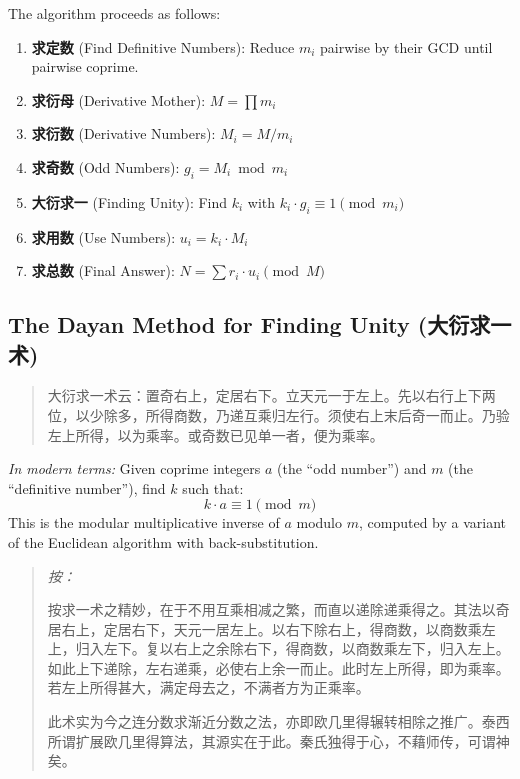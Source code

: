 \documentclass[11pt,a4paper]{article}
\newenvironment{editorial}{%
  \small\begin{quote}\color{prefacecolor}\textit{按：}%
}{\end{quote}\normalsize}
\newcommand{\zhtext}[1]{{\chinese #1}}
\begin{document}
The algorithm proceeds as follows:
\begin{enumerate}[label=Step \arabic*.]
  \item \textbf{求定数} (Find Definitive Numbers): Reduce $m_i$ pairwise by their GCD until pairwise coprime.
  \item \textbf{求衍母} (Derivative Mother): $M = \prod m_i$
  \item \textbf{求衍数} (Derivative Numbers): $M_i = M / m_i$
  \item \textbf{求奇数} (Odd Numbers): $g_i = M_i \bmod m_i$
  \item \textbf{大衍求一} (Finding Unity): Find $k_i$ with $k_i \cdot g_i \equiv 1 \pmod{m_i}$
  \item \textbf{求用数} (Use Numbers): $u_i = k_i \cdot M_i$
  \item \textbf{求总数} (Final Answer): $N = \sum r_i \cdot u_i \pmod{M}$
\end{enumerate}

\subsection{The Dayan Method for Finding Unity (\zhtext{大衍求一术})}

\begin{quote}
\zhtext{大衍求一术云：置奇右上，定居右下。立天元一于左上。先以右行上下两位，以少除多，所得商数，乃递互乘归左行。须使右上末后奇一而止。乃验左上所得，以为乘率。或奇数已见单一者，便为乘率。}
\end{quote}

\textit{In modern terms:} Given coprime integers $a$ (the ``odd number'') and $m$ (the ``definitive number''), find $k$ such that:
\[k \cdot a \equiv 1 \pmod{m}\]
This is the modular multiplicative inverse of $a$ modulo $m$, computed by a variant of the Euclidean algorithm with back-substitution.

\begin{editorial}
按求一术之精妙，在于不用互乘相减之繁，而直以递除递乘得之。其法以奇居右上，定居右下，天元一居左上。以右下除右上，得商数，以商数乘左上，归入左下。复以右上之余除右下，得商数，以商数乘左下，归入左上。如此上下递除，左右递乘，必使右上余一而止。此时左上所得，即为乘率。若左上所得甚大，满定母去之，不满者方为正乘率。

此术实为今之连分数求渐近分数之法，亦即欧几里得辗转相除之推广。泰西所谓扩展欧几里得算法，其源实在于此。秦氏独得于心，不藉师传，可谓神矣。
\end{editorial}
\end{document}
